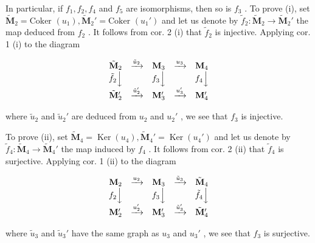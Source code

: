 In particular, if \(f_1, f_2, f_4\) and \(f_5\) are isomorphisms, then so is \(f_3\) . To prove (i), set \(\tilde{\mathbf{M}}_2 = \text{Coker } (u_1), \tilde{\mathbf{M}}_2' = \text{Coker } (u_1')\) and let us denote by \(\tilde{f}_2: \tilde{\mathbf{M}}_2 \to \tilde{\mathbf{M}}_2'\) the map deduced from \(f_2\) . It follows from cor. 2 (i) that \(\tilde{f}_2\) is injective. Applying cor. 1 (i) to the diagram

\[
\begin{array}{c c c c c} \tilde {\mathbf {M}} _ {2} & \xrightarrow {\tilde {u} _ {2}} & \mathbf {M} _ {3} & \xrightarrow {u _ {3}} & \mathbf {M} _ {4} \\ \tilde {f} _ {2} \Big \downarrow & & f _ {3} \Big \downarrow & & f _ {4} \Big \downarrow \\ \tilde {\mathbf {M}} _ {2} ^ {\prime} & \xrightarrow {\tilde {u} _ {2} ^ {\prime}} & \mathbf {M} _ {3} ^ {\prime} & \xrightarrow {u _ {3} ^ {\prime}} & \mathbf {M} _ {4} ^ {\prime} \end{array}
\]

where \(\tilde{u}_2\) and \(\tilde{u}_2'\) are deduced from \(u_2\) and \(u_2'\) , we see that \(f_3\) is injective.

To prove (ii), set \(\tilde{\mathbf{M}}_{4} = \operatorname{Ker}(u_{4}), \tilde{\mathbf{M}}_{4}' = \operatorname{Ker}(u_{4}')\) and let us denote by \(\tilde{f}_{4}: \tilde{\mathbf{M}}_{4} \to \tilde{\mathbf{M}}_{4}'\) the map induced by \(f_{4}\) . It follows from cor. 2 (ii) that \(\tilde{f}_{4}\) is surjective. Applying cor. 1 (ii) to the diagram

\[
\begin{array}{c c c c c} \mathbf {M} _ {2} & \xrightarrow {u _ {2}} & \mathbf {M} _ {3} & \xrightarrow {\tilde {u} _ {3}} & \tilde {\mathbf {M}} _ {4} \\ f _ {2} \Big \downarrow & & f _ {3} \Big \downarrow & & \tilde {f} _ {4} \Big \downarrow \\ \mathbf {M} _ {2} ^ {\prime} & \xrightarrow {u _ {2} ^ {\prime}} & \mathbf {M} _ {3} ^ {\prime} & \xrightarrow {\tilde {u} _ {3} ^ {\prime}} & \tilde {\mathbf {M}} _ {4} ^ {\prime} \end{array}
\]

where \(\tilde{u}_3\) and \(\tilde{u}_3'\) have the same graph as \(u_3\) and \(u_3'\) , we see that \(f_3\) is surjective.

